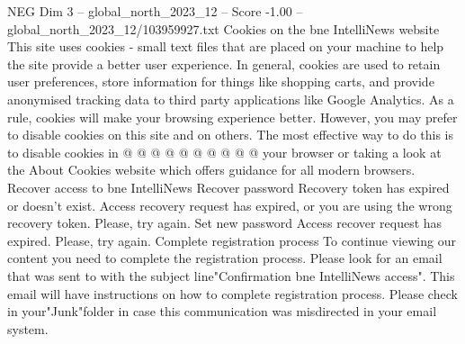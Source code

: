 \begin{textsample}{NEG Dim 3 – global\_north\_2023\_12 – Score -1.00 – global\_north\_2023\_12/103959927.txt}
Cookies on the bne IntelliNews website This site uses cookies - small text files that are placed on your machine to help the site provide a better user experience.
In general, cookies are used to retain user preferences, store information for things like shopping carts, and provide anonymised tracking data to third party applications like Google Analytics.
As a rule, cookies will make your browsing experience better.
However, you may prefer to disable cookies on this site and on others.
The most effective way to do this is to disable cookies in @ @ @ @ @ @ @ @ @ @ your browser or taking a look at the About Cookies website which offers guidance for all modern browsers.
Recover access to bne IntelliNews Recover password Recovery token has expired or doesn't exist.
Access recovery request has expired, or you are using the wrong recovery token.
Please, try again.
Set new password Access recover request has expired.
Please, try again.
Complete registration process To continue viewing our content you need to complete the registration process.
Please look for an email that was sent to with the subject line"Confirmation bne IntelliNews access".
This email will have instructions on how to complete registration process.
Please check in your"Junk"folder in case this communication was misdirected in your email system.

\end{textsample}
